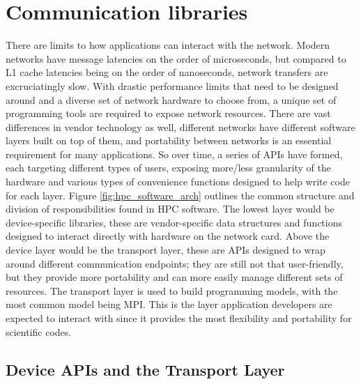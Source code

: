 \section{Communication libraries} 

There are limits to how applications can interact with the network.
Modern networks have message latencies on the order of microseconds, but compared to L1 cache latencies being on the order of nanoseconds, network transfers are excruciatingly slow.
With drastic performance limits that need to be designed around and a diverse set of network hardware to choose from, a unique set of programming tools are required to expose network resources. 
There are vast differences in vendor technology as well, different networks have different software layers built on top of them, and portability between networks is an essential requirement for many applications. 
So over time, a series of \gls{API}s have formed, each targeting different types of users, exposing more/less granularity of the hardware and various types of convenience functions designed to help write code for each layer.
Figure \ref{fig:hpc_software_arch} outlines the common structure and division of responsibilities found in HPC software.
The lowest layer would be device-specific libraries, these are vendor-specific data structures and functions designed to interact directly with hardware on the network card.
Above the device layer would be the transport layer, these are \gls{API}s designed to wrap around different communication endpoints; they are still not that user-friendly, but they provide more portability and can more easily manage different sets of resources.
The transport layer is used to build programming models, with the most common model being \gls{MPI}.
This is the layer application developers are expected to interact with since it provides the most flexibility and portability for scientific codes.

\subsection{Device APIs and the Transport Layer}


